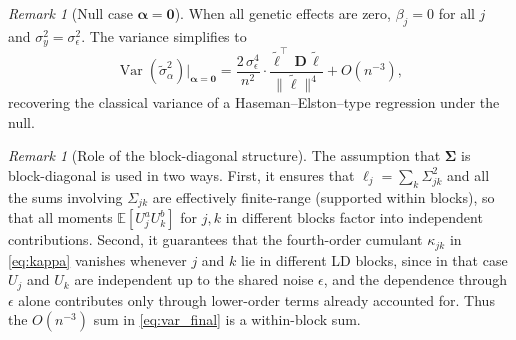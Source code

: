 \documentclass[11pt]{article}
\newcommand{\Var}{\operatorname{Var}}
\newcommand{\E}{\mathbb{E}}
\newcommand{\bSig}{\boldsymbol{\Sigma}}
\newcommand{\balpha}{\boldsymbol{\alpha}}
\theoremstyle{plain}
\theoremstyle{definition}
\theoremstyle{remark}
\newtheorem{remark}[theorem]{Remark}
\begin{document}
\begin{remark}[Null case $\balpha=\mathbf{0}$]
When all genetic effects are zero, $\beta_j=0$ for all $j$ and
$\sigma_y^2=\sigma_\epsilon^2$.  The variance simplifies to
\[
    \Var(\widetilde\sigma_\alpha^2)\Big|_{\balpha=\mathbf{0}}
    = \frac{2\,\sigma_\epsilon^4}{n^2}\cdot
      \frac{\widetilde{\boldsymbol\ell}^\top\,\mathbf{D}\,
            \widetilde{\boldsymbol\ell}}
           {\|\widetilde{\boldsymbol\ell}\|^4}
    + O(n^{-3}),
\]
recovering the classical variance of a Haseman--Elston--type
regression under the null.
\end{remark}

\begin{remark}[Role of the block-diagonal structure]
The assumption that $\bSig$ is block-diagonal is used in two ways.
First, it ensures that $\ell_j=\sum_k\Sigma_{jk}^2$ and all
the sums involving $\Sigma_{jk}$ are effectively finite-range
(supported within blocks), so that all moments
$\E[U_j^{a}U_k^{b}]$ for $j,k$ in different blocks factor into
independent contributions.
Second, it guarantees that the fourth-order cumulant $\kappa_{jk}$
in \eqref{eq:kappa} vanishes whenever $j$ and $k$ lie in different
LD blocks, since in that case $U_j$ and $U_k$ are independent up
to the shared noise $\epsilon$, and the dependence through $\epsilon$
alone contributes only through lower-order terms already accounted
for. Thus the $O(n^{-3})$ sum in \eqref{eq:var_final}
is a within-block sum.
\end{remark}
\end{document}
